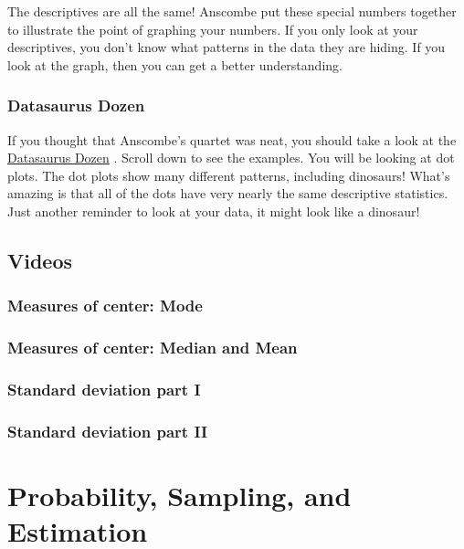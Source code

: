 \documentclass[
]{book}
\begin{document}
The descriptives are all the same! Anscombe put these special numbers together to illustrate the point of graphing your numbers. If you only look at your descriptives, you don't know what patterns in the data they are hiding. If you look at the graph, then you can get a better understanding.

\subsection{Datasaurus Dozen}\label{datasaurus-dozen}

If you thought that Anscombe's quartet was neat, you should take a look at the \href{https://www.autodeskresearch.com/publications/samestats}{Datasaurus Dozen} \citep{matejka2017same}. Scroll down to see the examples. You will be looking at dot plots. The dot plots show many different patterns, including dinosaurs! What's amazing is that all of the dots have very nearly the same descriptive statistics. Just another reminder to look at your data, it might look like a dinosaur!

\section{Videos}\label{videos-1}

\subsection{Measures of center: Mode}\label{measures-of-center-mode}

\subsection{Measures of center: Median and Mean}\label{measures-of-center-median-and-mean}

\subsection{Standard deviation part I}\label{standard-deviation-part-i}

\subsection{Standard deviation part II}\label{standard-deviation-part-ii}

\chapter{Probability, Sampling, and Estimation}\label{probability-sampling-and-estimation}
\end{document}
